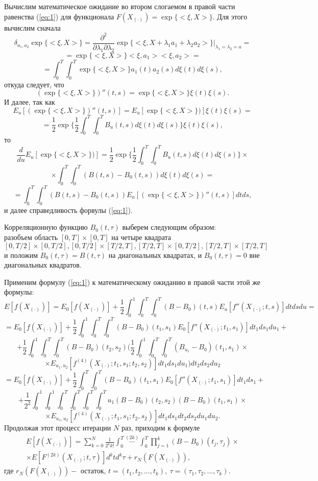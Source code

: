 \documentclass [12pt]{report}
\begin{document}
Вычислим математическое ожидание во втором слогаемом в правой
части равенства (\ref{eq:1}) для функционала
$ F(X_{(\cdot)}) = \exp\{<\xi,X>\}.$
Для этого вычислим сначала
$$
\delta_{a_1,a_2}\exp\{<\xi,X>\} =
\frac{\partial^2}{\partial \lambda_1 \partial \lambda_2}
\exp\{<\xi,X + \lambda_1 a_1 + \lambda_2 a_2>\}
\big|_{\lambda_1=\lambda_2=a}=
$$
$$
= \exp\{<\xi,X>\}<\xi,a_1><\xi,a_2> =
$$
$$
=\int_{0}^{T}\int_{0}^{T}\exp\{<\xi,X>\}a_1(t)a_2(s)d\xi(t)d\xi(s),
$$
откуда следует, что
\begin{equation}\label{eq:6}
(\exp\{<\xi,X>\})''(t,s)=\exp\{<\xi,X>\}\xi(t)\xi(s).
\end{equation}
И далее, так как
$$
E_u[(\exp\{<\xi,X>\})''(t,s)] = E_u[\exp\{<\xi,X>\})]\xi(t)\xi(s)=
$$
$$
=\frac{1}{2}\exp\{\frac{1}{2}
\int_{0}^{T}\int_{0}^{T}B_u(t,s)d\xi(t)d\xi(s)\}\xi(t)\xi(s),
$$
то
$$
\frac{d}{du}E_u[\exp\{<\xi,X>\})]=
\frac{1}{2}\exp\{\frac{1}{2}
\int_{0}^{T}\int_{0}^{T}B_u(t,s)d\xi(t)d\xi(s)\}\times
$$
$$
\times\int_{0}^{T}\int_{0}^{T}(B(t,s)-B_0(t,s))d\xi(t)d\xi(s) =
$$
$$
=\int_{0}^{T}\int_{0}^{T}(B(t,s)-B_0(t,s))
E_u[(\exp\{<\xi,X>\})''(t,s)] dtds,
$$
и далее справедливость форвулы (\ref{eq:1}).


Корреляционную функцию $B_0(t,\tau)$ выберем следующим образом: \\
разобъем область $[0,T]\times[0,T]$ на четыре квадрата
$$
[0,T/2] \times [0, T/2],[0,T/2] \times [T/2, T],[T/2,T] \times [0, T/2],[T/2,T] \times [T/2, T]
$$
и положим $B_0(t,\tau) = B(t,\tau)$ на диагональных квадратах, и $B_0(t,\tau)=0$ вне диагональных квадратов.

Применим формулу (\ref{eq:1}) к математическому ожиданию в правой части этой же формулы:
$$
E[f(X_{(\cdot)})] = E_0[f(X_{(\cdot)})] + \frac{1}{2}\int_0^1\int_0^T\int_0^T{(B-B_0)(t,s)}E_u[f''(X_{(\cdot)};t,s)]dtdsdu =
$$
$$
= E_0[f(X_{(\cdot)})] + \frac{1}{2}\int_0^1\int_0^T\int_0^T{(B-B_0)(t_1,s_1)} E_0[f''(X_{(\cdot)};t_1,s_1)]dt_1ds_1du_1 +
$$
$$
+ \frac{1}{2}\int_0^1\int_0^T\int_0^T{(B-B_0)(t_2,s_2)}\big(
  \frac{1}{2}\int_0^1\int_0^T\int_0^T{(B_{u_1}-B_0)(t_1,s_1)} \times
$$
$$
\times E_{u_1,u_2}[f^{(4)}(X_{(\cdot)};t_1,s_1;t_2,s_2)]dt_1ds_1du_1 \big)
dt_2ds_2du_2
$$
$$
= E_0[f(X_{(\cdot)})] + \frac{1}{2}\int_0^T\int_0^T{(B-B_0)(t_1,s_1)} E_0[f''(X_{(\cdot)};t_1,s_1)]dt_1ds_1 +
$$
$$
+ \frac{1}{2^2}\int_0^1\int_{0}^{1}\int_0^T\int_0^T\int_0^T\int_0^T{u_1(B-B_0)(t_2,s_2)(B-B_0)(t_1,s_1)} \times
$$
$$
\times E_{u_1,u_2}[f^{(4)}(X_{(\cdot)};t_1,s_1;t_2,s_2)]dt_1ds_1
dt_2ds_2du_1du_2.
$$
Продолжая этот процесс итерации $N$ раз, приходим к формуле
\begin{equation}\label{eq:3}
\begin{split}
E[f(X_{(\cdot)})] = \sum_{k=0}^{N}\frac{1}{2^{k}k!}\int_{0}^{T}\stackrel{(2k)}{\cdots}\int_{0}^{T}
\prod_{j=1}^{k}(B-B_0)(t_j, \tau_j)\times \\
\times E[F^{(2k)}(X_{(\cdot)};t,\tau)]d^ktd^k\tau + r_N(F(X_{(\cdot)})),
\end{split}
\end{equation}
где $r_N(F(X_{(\cdot)})) -$ остаток, $t=(t_1,t_2,...,t_k),~ \tau=(\tau_1, \tau_2,...,\tau_k).$
\end{document}
